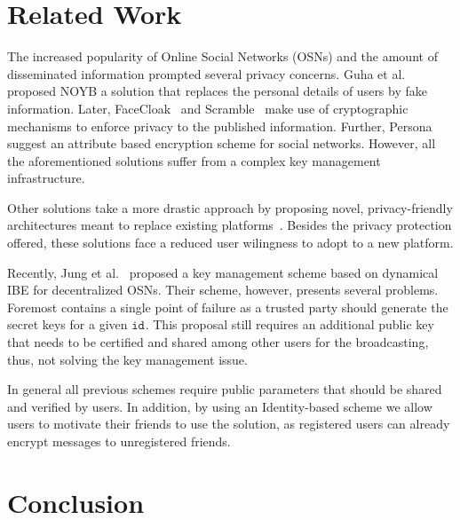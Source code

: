 \documentclass{llncs}
\newcommand{\id}[1]{\ensuremath{\mathtt{id}_{#1}}}
\begin{document}
\section{Related Work}\label{sec:relwork}
The increased popularity of Online Social Networks (OSNs) and the amount of disseminated information prompted several privacy concerns. 
Guha et al.~\cite{Guha:2008} proposed NOYB a solution that replaces the personal details of users by fake information. Later, FaceCloak~\cite{Luo:2009} and Scramble~\cite{BeatoScramble} make use of cryptographic mechanisms to enforce privacy to the published information. Further, Persona suggest an attribute based encryption scheme for social networks. However, all the aforementioned solutions suffer from a complex key management infrastructure. 


Other solutions take a more drastic approach by proposing novel, privacy-friendly architectures meant to replace existing platforms~\cite{DBLP:conf/sp/CristofaroSTW12,NYT2010.Diaspora,DBLP:conf/wowmom/CutilloMO11}. Besides the privacy protection offered, these solutions face a reduced user wilingness to adopt to a new platform.

Recently, Jung et al.~\cite{jung} proposed a key management scheme based on dynamical IBE for decentralized OSNs. Their scheme, however, presents several problems. Foremost contains a single point of failure as a trusted party should generate the secret keys for a given \id{}. This proposal still requires an additional public key that needs to be certified and shared among other users for the broadcasting, thus, not solving the key management issue.

In general all previous schemes require public parameters that should be shared and verified by users. In addition, by using an Identity-based scheme we allow users to motivate their friends to use the solution, as registered users can already encrypt messages to unregistered friends.



\section{Conclusion}\label{sec:conc}
\end{document}

